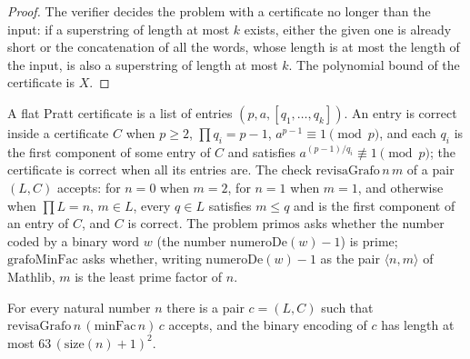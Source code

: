 \begin{proof}
  \leanok
  The verifier decides the problem with a certificate no longer than the input: if a superstring
  of length at most $k$ exists, either the given one is already short or the concatenation of all
  the words, whose length is at most the length of the input, is also a superstring of length at
  most $k$. The polynomial bound of the certificate is $X$.
\end{proof}

\begin{definition}
  \label{def:structure-pratt}
  \leanok
  A flat Pratt certificate is a list of entries $(p, a, [q_1, \dots, q_k])$. An entry is correct
  inside a certificate $C$ when $p \ge 2$, $\prod q_i = p - 1$, $a^{p-1} \equiv 1 \pmod p$, and each
  $q_i$ is the first component of some entry of $C$ and satisfies $a^{(p-1)/q_i} \not\equiv 1 \pmod
  p$; the certificate is correct when all its entries are. The check $\mathrm{revisaGrafo}\,n\,m$ of
  a pair $(L, C)$ accepts: for $n = 0$ when $m = 2$, for $n = 1$ when $m = 1$, and otherwise when
  $\prod L = n$, $m \in L$, every $q \in L$ satisfies $m \le q$ and is the first component of an
  entry of $C$, and $C$ is correct. The problem $\mathrm{primos}$ asks whether the number coded by
  a binary word $w$ (the number $\mathrm{numeroDe}(w) - 1$) is prime; $\mathrm{grafoMinFac}$ asks
  whether, writing $\mathrm{numeroDe}(w) - 1$ as the pair $\langle n, m \rangle$ of Mathlib, $m$ is the
  least prime factor of $n$.
  \own{}
\end{definition}

\begin{theorem}
  \label{thm:structure-certificado-grafo}
  \leanok
  For every natural number $n$ there is a pair $c = (L, C)$ such that
  $\mathrm{revisaGrafo}\,n\,(\mathrm{minFac}\,n)\,c$ accepts, and the binary encoding of $c$ has
  length at most $63\,(\mathrm{size}(n) + 1)^2$.
\end{theorem}


